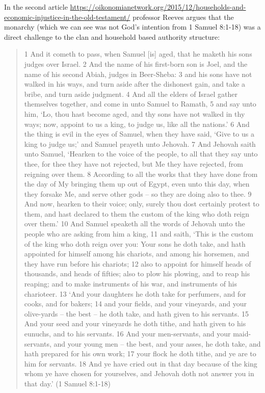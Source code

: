\documentclass[11pt]{article}
\begin{document}
{In the second article \url{https://oikonomianetwork.org/2015/12/households-and-economic-injustice-in-the-old-testament/} professor Reeves argues that the monarchy (which we can see was not God's intention from 1 Samuel 8:1-18) was a direct challenge to the clan and household based authority structure:

\begin{quote}
1 And it cometh to pass, when Samuel [is] aged, that he maketh his sons judges over Israel.
2 And the name of his first-born son is Joel, and the name of his second Abiah, judges in Beer-Sheba:
3 and his sons have not walked in his ways, and turn aside after the dishonest gain, and take a bribe, and turn aside judgment.
4 And all the elders of Israel gather themselves together, and come in unto Samuel to Ramath,
5 and say unto him, `Lo, thou hast become aged, and thy sons have not walked in thy ways; now, appoint to us a king, to judge us, like all the nations.'
6 And the thing is evil in the eyes of Samuel, when they have said, `Give to us a king to judge us;' and Samuel prayeth unto Jehovah.
7 And Jehovah saith unto Samuel, `Hearken to the voice of the people, to all that they say unto thee, for thee they have not rejected, but Me they have rejected, from reigning over them.
8 According to all the works that they have done from the day of My bringing them up out of Egypt, even unto this day, when they forsake Me, and serve other gods -- so they are doing also to thee.
9 And now, hearken to their voice; only, surely thou dost certainly protest to them, and hast declared to them the custom of the king who doth reign over them.'
10 And Samuel speaketh all the words of Jehovah unto the people who are asking from him a king,
11 and saith, `This is the custom of the king who doth reign over you: Your sons he doth take, and hath appointed for himself among his chariots, and among his horsemen, and they have run before his chariots;
12 also to appoint for himself heads of thousands, and heads of fifties; also to plow his plowing, and to reap his reaping; and to make instruments of his war, and instruments of his charioteer.
13 `And your daughters he doth take for perfumers, and for cooks, and for bakers;
14 and your fields, and your vineyards, and your olive-yards -- the best -- he doth take, and hath given to his servants.
15 And your seed and your vineyards he doth tithe, and hath given to his eunuchs, and to his servants.
16 And your men-servants, and your maid-servants, and your young men -- the best, and your asses, he doth take, and hath prepared for his own work;
17 your flock he doth tithe, and ye are to him for servants.
18 And ye have cried out in that day because of the king whom ye have chosen for yourselves, and Jehovah doth not answer you in that day.' (1 Samuel 8:1-18)
\end{quote} 

}
\end{document}
